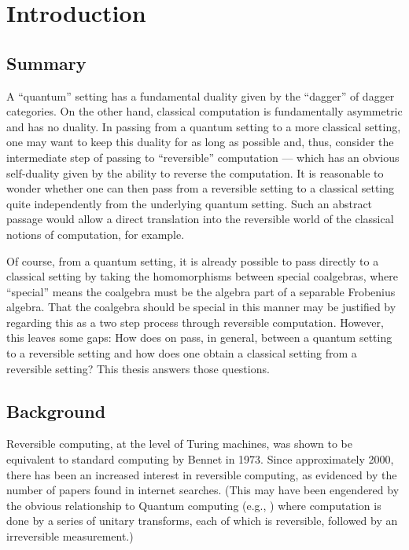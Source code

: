 \chapter{Introduction}\label{chap:introduction}
\section{Summary}\label{sec:summary}
A ``quantum'' setting has a fundamental duality given by the ``dagger'' of dagger
categories\cite{selinger05:dagger,abramsky05:abstractscalars}. On the other hand, classical
computation is fundamentally asymmetric and has no duality. In passing from a quantum setting to a more classical setting, one
may want to keep this duality for as long as possible and, thus, consider the intermediate step of
passing to ``reversible'' computation --- which has an obvious self-duality given by the ability to
reverse the computation. It is reasonable to
wonder whether one can then pass from a reversible setting to a classical setting quite
independently from the underlying quantum setting. Such an abstract
passage would allow a direct translation into the reversible world of the classical notions of
computation, for example.

Of course, from a quantum setting, it is already possible to pass directly to a classical setting by
taking the homomorphisms between special coalgebras, where ``special'' means the coalgebra must be
the algebra part of a separable Frobenius algebra. That the coalgebra should be special in this manner
may be justified by regarding this as a two step process through reversible computation. However,
this leaves some gaps: How does on pass, in general, between a quantum setting to a reversible
setting and how does one obtain a classical setting from a reversible setting? This thesis answers
those questions.
\section{Background}
\label{sec:background}

Reversible computing, at the level of Turing machines, was shown to be equivalent to standard
computing by Bennet \cite{bennett:1973reverse} in 1973. Since approximately 2000, there has
been an increased interest in reversible computing, as evidenced by the number of papers found in
internet searches. (This may have been engendered by the obvious relationship
to Quantum computing (e.g., \cite{neilsen2000:QuantumComputationAndInfo}) where computation is done
by a series of unitary transforms, each of which is reversible, followed by an irreversible
measurement.)

